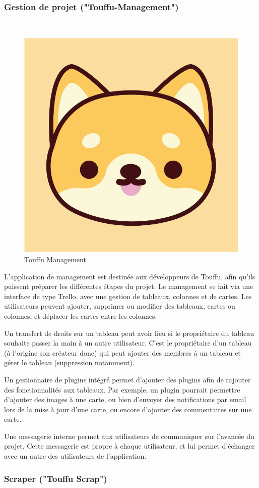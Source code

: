 \documentclass[conference]{IEEEtran}
\begin{document}
\subsubsection{Gestion de projet ("Touffu-Management")}\hfil\\

\begin{figure}[h]
	\centering
	\includegraphics[width=0.4\columnwidth]{Ressources/Icons/v1_1@3x.png}
	\caption{Touffu Management}
	\label{fig:logotouffu-management}
\end{figure}

L'application de management est destinée aux développeurs de Touffu, afin qu'ils puissent préparer les différentes étapes du projet. Le management se fait via une interface de type Trello, avec une gestion de tableaux, colonnes et de cartes. Les utilisateurs peuvent ajouter, supprimer ou modifier des tableaux, cartes ou colonnes, et déplacer les cartes entre les colonnes.

Un transfert de droits sur un tableau peut avoir lieu si le propriétaire du tableau souhaite passer la main à un autre utilisateur. C'est le propriétaire d'un tableau (à l'origine son créateur donc) qui peut ajouter des membres à un tableau et gérer le tableau (suppression notamment).

Un gestionnaire de plugins intégré permet d'ajouter des plugins afin de rajouter des fonctionnalités aux tableaux. Par exemple, un plugin pourrait permettre d'ajouter des images à une carte, ou bien d'envoyer des notifications par email lors de la mise à jour d'une carte, ou encore d'ajouter des commentaires sur une carte.

Une messagerie interne permet aux utilisateurs de communiquer sur l'avancée du projet. Cette messagerie est propre à chaque utilisateur, et lui permet d'échanger avec un autre des utilisateurs de l'application.\\

\subsubsection{Scraper ("Touffu Scrap")}\hfill\\
\end{document}
